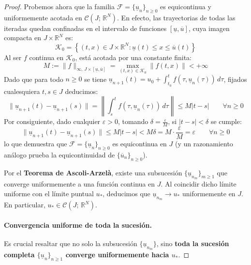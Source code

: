 \begin{proof}
    Probemos ahora que la familia $\mathcal{F} = \{\underline{u}_n\}_{n \geq 0}$ es equicontinua y uniformemente acotada en $\mathcal{C}(J; \, \mathbb{R}^N)$. En efecto, las trayectorias de todas las iteradas quedan confinadas en el intervalo de funciones $[\underline{u}, \overline{u}]$, cuya imagen compacta en $J \times \mathbb{R}^N$ es:
    \[
        \mathcal{K}_0 = \left\{ (t, x) \in J \times \mathbb{R}^N : \underline{u}(t) \leq x \leq \overline{u}(t) \right\}
    \]
    Al ser $f$ continua en $\mathcal{K}_0$, está acotada por una constante finita:
    \[
        M := \|f\|_{\infty, \, J \times [\underline{u}, \overline{u}]} = \max_{(t, x) \in \mathcal{K}_0} \|f(t, x)\| < +\infty
    \]
    Dado que para todo $n \geq 0$ se tiene $\underline{u}_{n+1}(t) = u_0 + \int_{t_0}^t f(\tau, \underline{u}_n(\tau)) \, d\tau$, fijados cualesquiera $t, s \in J$ deducimos:
    \[
        \|\underline{u}_{n+1}(t) - \underline{u}_{n+1}(s)\| = \left\| \int_s^t f(\tau, \underline{u}_n(\tau)) \, d\tau \right\| \leq M |t - s| \qquad \forall n \geq 0
    \]
    Por consiguiente, dado cualquier $\varepsilon > 0$, tomando $\delta = \frac{\varepsilon}{M}$, si $|t - s| < \delta$ se cumple:
    \[
        \|\underline{u}_{n+1}(t) - \underline{u}_{n+1}(s)\| \leq M |t - s| < M \delta = M \cdot \frac{\varepsilon}{M} = \varepsilon \qquad \forall n \geq 0
    \]
    lo que demuestra que $\mathcal{F} = \{\underline{u}_n\}_{n \geq 0}$ es equicontinua en $J$ (y un razonamiento análogo prueba la equicontinuidad de $\{\overline{u}_n\}_{n \geq 0}$).

    Por el \textbf{Teorema de Ascoli-Arzelà}, existe una subsucesión $\{\underline{u}_{n_m}\}_{m \geq 1}$ que converge uniformemente a una función continua en $J$. Al coincidir dicho límite uniforme con el límite puntual $u_*$, deducimos que $\underline{u}_{n_m} \to u_*$ uniformemente en $J$. En particular, $u_* \in \mathcal{C}(J; \, \mathbb{R}^N)$.

    \paragraph{Convergencia uniforme de toda la sucesión.}
    Es crucial resaltar que no solo la subsucesión $\{\underline{u}_{n_m}\}$, sino \textbf{toda la sucesión completa $\{\underline{u}_n\}_{n \geq 1}$ converge uniformemente hacia $u_*$}. 
    

\end{proof}

